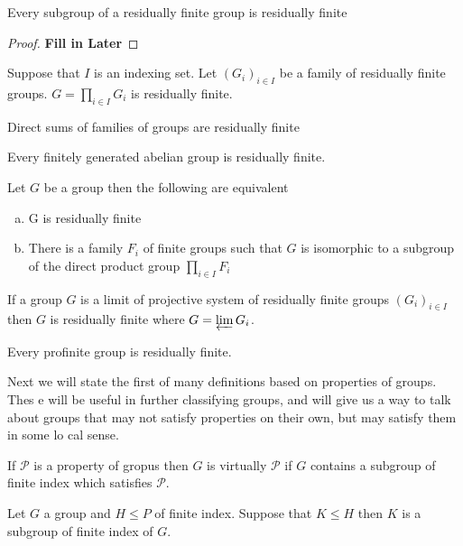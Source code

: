 \begin{propn}
  Every subgroup of a residually finite group is residually finite
\end{propn}
\begin{proof}
  \textbf{Fill in Later}
\end{proof}

\begin{propn}
  Suppose that $I$ is an indexing set. Let $(G_i)_{i \in I}$ be a family of
  residually finite groups. $G = \prod_{i \in I}^{} G_i $ is residually finite.
\end{propn}

\begin{cor}
  Direct sums of families of groups are residually finite
\end{cor}
\begin{cor}
  Every finitely generated abelian group is residually finite.
\end{cor}
\begin{cor}
  Let $G$ be a group then the following are equivalent
  \begin{enumerate}[(a)]
    \item G is residually finite
    \item There is a family $F_i$ of finite groups such that $G$ is isomorphic
      to a subgroup of the direct product group $\prod_{i \in I} F_i$
  \end{enumerate}
\end{cor}

\begin{propn}
  If a group $G$ is a limit of projective system of residually finite groups
  $(G_i)_{i \in I}$ then $G$ is residually finite where $G = \varprojlim G_i$.
\end{propn}
\begin{cor}
  Every profinite group is residually finite.
\end{cor}

Next we will state the first of many definitions based on properties of groups. Thes
e will be useful in further classifying groups, and will give us a way to talk about
groups that may not satisfy properties on their own, but may satisfy them in some lo
cal sense.

\begin{defn}
  If $\mathcal{P}$ is a property of gropus then $G$ is virtually $\mathcal{P}$ 
  if $G$ contains a subgroup of finite index which satisfies $\mathcal{P}$.
\end{defn}
\begin{lemma}
  Let $G$ a group and $H \le P$ of finite index. Suppose that $K \le H$ then
  $K$ is a subgroup of finite index of  $G$.
\end{lemma}

